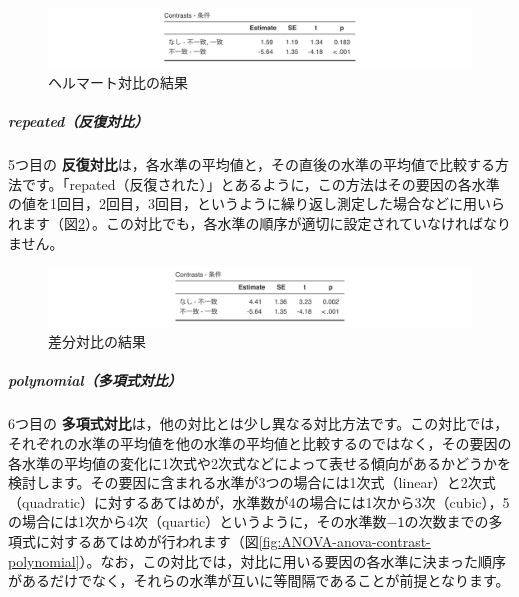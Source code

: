 \documentclass[
  12pt,
  a5jpaper,
  lualatex, ja=standard]{bxjsbook}
\renewcommand{\emph}[1]{\textbf{\color{emph} #1}}
\begin{document}
\begin{figure}[!ht]

{\centering \includegraphics[width=1\linewidth]{images/ANOVA/anova-contrast-helmert} 

}

\caption{ヘルマート対比の結果}\label{fig:ANOVA-anova-contrast-helmert}
\end{figure}

\hypertarget{repeatedux53cdux5fa9ux5bfeux6bd4}{%
\subparagraph*{repeated（反復対比）}\label{repeatedux53cdux5fa9ux5bfeux6bd4}}

5つ目の\emph{反復対比}は，各水準の平均値と，その直後の水準の平均値で比較する方法です。「repated（反復された）」とあるように，この方法はその要因の各水準の値を1回目，2回目，3回目，というように繰り返し測定した場合などに用いられます（図\ref{fig:ANOVA-anova-contrast-repeated}）。この対比でも，各水準の順序が適切に設定されていなければなりません。

\begin{figure}[!ht]

{\centering \includegraphics[width=1\linewidth]{images/ANOVA/anova-contrast-repeated} 

}

\caption{差分対比の結果}\label{fig:ANOVA-anova-contrast-repeated}
\end{figure}

\hypertarget{polynomialux591aux9805ux5f0fux5bfeux6bd4}{%
\subparagraph*{polynomial（多項式対比）}\label{polynomialux591aux9805ux5f0fux5bfeux6bd4}}

6つ目の\emph{多項式対比}は，他の対比とは少し異なる対比方法です。この対比では，それぞれの水準の平均値を他の水準の平均値と比較するのではなく，その要因の各水準の平均値の変化に1次式や2次式などによって表せる傾向があるかどうかを検討します。その要因に含まれる水準が3つの場合には1次式（linear）と2次式（quadratic）に対するあてはめが，水準数が4の場合には1次から3次（cubic），5の場合には1次から4次（quartic）というように，その水準数\(-\textsf{1}\)の次数までの多項式に対するあてはめが行われます（図\ref{fig:ANOVA-anova-contrast-polynomial}）。なお，この対比では，対比に用いる要因の各水準に決まった順序があるだけでなく，それらの水準が互いに等間隔であることが前提となります。
\end{document}
